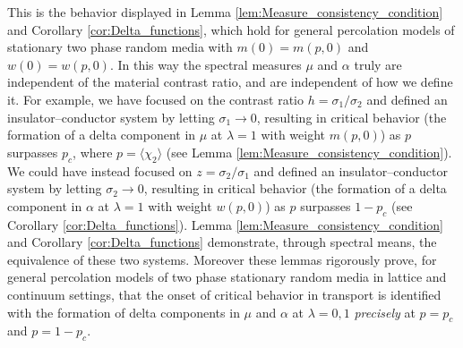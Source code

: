 \documentclass[english,12pt,jmp,graphicx]{revtex4-1}
\begin{document}
This is the behavior displayed in Lemma
\ref{lem:Measure_consistency_condition} and Corollary
\ref{cor:Delta_functions}, which hold for general percolation models of
stationary two phase random media with $m(0)=m(p,0)$ and
$w(0)=w(p,0)$. In this way the spectral measures $\mu$ and $\alpha$ truly are
independent of the material contrast ratio, and are independent of how
we define it. For example, we have focused on the contrast ratio
$h=\sigma_1/\sigma_2$ and defined an insulator--conductor system by letting
$\sigma_1\to0$, resulting in critical behavior (the formation of a delta
component in $\mu$ at $\lambda=1$ with weight $m(p,0)$) as $p$ surpasses
$p_c$, where $p=\langle\chi_2\rangle$ (see Lemma
\ref{lem:Measure_consistency_condition}). We could have instead 
focused on $z=\sigma_2/\sigma_1$ and defined an insulator--conductor system by
letting $\sigma_2\to0$, resulting in critical behavior (the formation of a
delta component in $\alpha$ at $\lambda=1$ with weight $w(p,0)$) as $p$ surpasses
$1-p_c$ (see Corollary \ref{cor:Delta_functions}). Lemma
\ref{lem:Measure_consistency_condition} and Corollary
\ref{cor:Delta_functions} demonstrate, through spectral means, the
equivalence of these two systems. Moreover these lemmas rigorously
prove, for general percolation models of two phase stationary random
media in lattice and continuum settings, that the onset of
critical behavior in transport is identified with the formation of
delta components in $\mu$ and $\alpha$ at $\lambda=0,1$ \emph{precisely}
at $p=p_c$ and $p=1-p_c$.  
%
%
\end{document}
